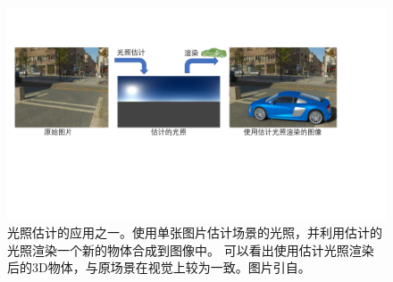 \begin{figure}[!htbp]
    \centering
    \includegraphics[width=1.0\textwidth]{Img/demo-problem-define.pdf}

    \caption[光照估计的应用]
    {光照估计的应用之一。使用单张图片估计场景的光照，并利用估计的光照渲染一个新的物体合成到图像中。
    可以看出使用估计光照渲染后的3D物体，与原场景在视觉上较为一致。图片引自\cite{hold2017deep}。}
    
    \label{fig:demo-problem-define}
\end{figure}